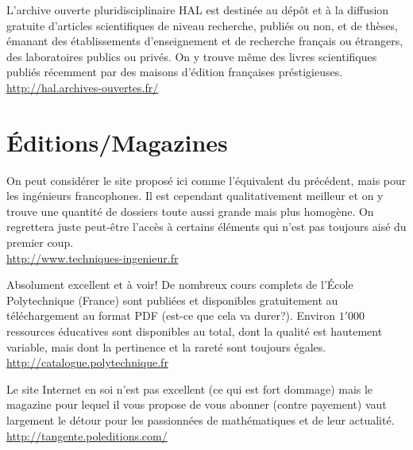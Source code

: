 	{\Large {}}{\Large {}}{\Large {}}\bcdfrance{} L'archive ouverte pluridisciplinaire HAL est destinée au dépôt et à la diffusion gratuite d'articles scientifiques de niveau recherche, publiés ou non, et de thèses, émanant des établissements d'enseignement et de recherche français ou étrangers, des laboratoires publics ou privés. On y trouve même des livres scientifiques publiés récemment par des maisons d'édition françaises préstigieuses.\\
	\href{http://hal.archives-ouvertes.fr/}{\color{blue} http://hal.archives-ouvertes.fr/}
	
	\pagebreak
	\section{Éditions/Magazines}

	{\Large {}}{\Large {}}{\Large {}}{\Large {}}{\Large {}}\bcdfrance{} On peut considérer le site proposé ici comme l'équivalent du précédent, mais pour les ingénieurs francophones. Il est cependant qualitativement meilleur et on y trouve une quantité de dossiers toute aussi grande mais plus homogène. On regrettera juste peut-être l'accès à certains éléments qui n'est pas toujours aisé du premier coup.\\
	\href{http://www.techniques-ingenieur.fr}{\color{blue} http://www.techniques-ingenieur.fr}
	
	{\Large {}}{\Large {}}{\Large {}}{\Large {}}\bcdfrance{} Absolument excellent et à voir! De nombreux cours complets de l'École Polytechnique (France) sont publiées et disponibles gratuitement au téléchargement au format PDF (est-ce que cela va durer?). Environ $1'000$ ressources éducatives sont disponibles au total, dont la qualité est hautement variable, mais dont la pertinence et la rareté sont toujours égales.\\
	\href{http://catalogue.polytechnique.fr}{\color{blue} http://catalogue.polytechnique.fr}
	
	{\Large {}}{\Large {}}{\Large {}}{\Large {}}\bcdfrance{} Le site Internet en soi n'est pas excellent (ce qui est fort dommage) mais le magazine pour lequel il vous propose de vous abonner (contre payement) vaut largement le détour pour les passionnées de mathématiques et de leur actualité.\\
	\href{http://tangente.poleditions.com/}{\color{blue}http://tangente.poleditions.com/}
	
